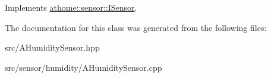 Implements \mbox{\hyperlink{classathome_1_1sensor_1_1_i_sensor_af86df8538fecfcfc670b4adfbbde6abb}{athome\+::sensor\+::\+I\+Sensor}}.



The documentation for this class was generated from the following files\+:\begin{DoxyCompactItemize}
\item 
src/A\+Humidity\+Sensor.\+hpp\item 
src/sensor/humidity/A\+Humidity\+Sensor.\+cpp\end{DoxyCompactItemize}
